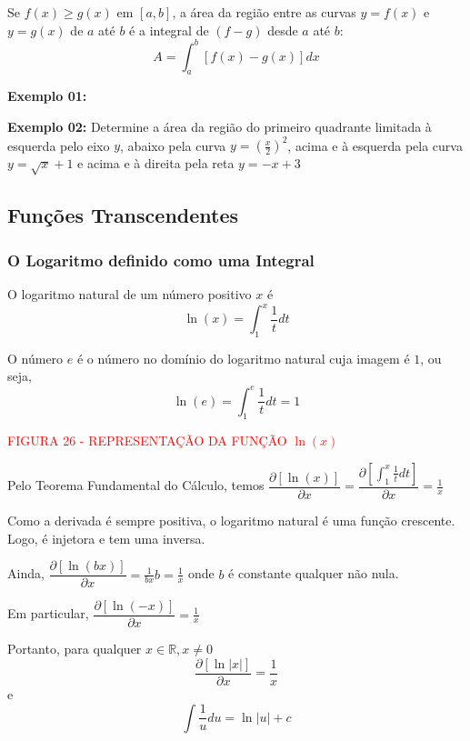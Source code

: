 \documentclass[oneside,a4paper,12pt]{article}
\begin{document}
Se $f(x) \geq g(x)$ em $[a,b]$, a área da região entre as curvas $y = f(x)$ e $y = g(x)$ de $a$ até $b$ é a integral de $(f-g)$ desde $a$ até $b$:
$$A = \int_{a}^{b}[f(x)-g(x)]dx$$

\vspace{100pt}
\newpage

{\bf Exemplo 01:}

\vspace{200pt}

{\bf Exemplo 02:} Determine a área da região do primeiro quadrante limitada à esquerda pelo eixo $y$, abaixo pela curva $y =( \frac{x}{2})^2$, acima e à esquerda pela curva $y = \sqrt{x} + 1$ e acima e à direita pela reta $y = -x + 3$

\newpage

\subsection{Funções Transcendentes}
\subsubsection{O Logaritmo definido como uma Integral}

O logaritmo natural de um número positivo $x$ é 
$$\ln(x) = \int_{1}^{x}\frac{1}{t}dt$$

O número $e$ é o número no domínio do logaritmo natural cuja imagem é $1$, ou seja,
$$\ln(e) = \int_{1}^{e}\frac{1}{t}dt = 1$$

\vspace{220pt}
\begin{center}
	\textcolor{red}{FIGURA 26 - REPRESENTAÇÃO DA FUNÇÃO $\ln(x)$}
\end{center}

Pelo Teorema Fundamental do Cálculo, temos $\dfrac{\partial [\ln(x)]}{\partial x} = \dfrac{\partial[\int_{1}^{x}\frac{1}{t}dt]}{\partial x} = \frac{1}{x}$

Como a derivada é sempre positiva, o logaritmo natural é uma função crescente. Logo, é injetora e tem uma inversa.

Ainda, $\dfrac{\partial [\ln(bx)]}{\partial x} = \frac{1}{bx}b = \frac{1}{x}$ onde $b$ é constante qualquer não nula.

Em particular, $\dfrac{\partial [\ln(-x)]}{\partial x} = \frac{1}{x}$

Portanto, para qualquer $x \in \mathbb{R}, x \neq 0$
$$\dfrac{\partial [\ln|x|]}{\partial x} = \frac{1}{x}$$
e
$$\int\frac{1}{u}du = \ln|u| + c$$
\end{document}
